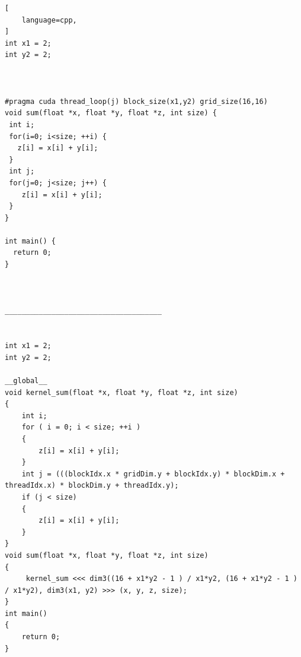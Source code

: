 \documentclass{article}
\begin{document}
	\begin{lstlisting}[
    language=cpp,
]
int x1 = 2;
int y2 = 2;



#pragma cuda thread_loop(j) block_size(x1,y2) grid_size(16,16)
void sum(float *x, float *y, float *z, int size) {
 int i;
 for(i=0; i<size; ++i) {
   z[i] = x[i] + y[i];
 }
 int j;
 for(j=0; j<size; j++) {
    z[i] = x[i] + y[i];
 }
}

int main() {
  return 0;
}



_____________________________________


int x1 = 2;
int y2 = 2;

__global__
void kernel_sum(float *x, float *y, float *z, int size)
{
	int i;
	for ( i = 0; i < size; ++i )
	{
		z[i] = x[i] + y[i];
	}
	int j = (((blockIdx.x * gridDim.y + blockIdx.y) * blockDim.x + threadIdx.x) * blockDim.y + threadIdx.y);
	if (j < size)
	{
		z[i] = x[i] + y[i];
	}
}
void sum(float *x, float *y, float *z, int size)
{
	 kernel_sum <<< dim3((16 + x1*y2 - 1 ) / x1*y2, (16 + x1*y2 - 1 ) / x1*y2), dim3(x1, y2) >>> (x, y, z, size);
}
int main()
{
	return 0;
}
\end{lstlisting}
\end{document}
